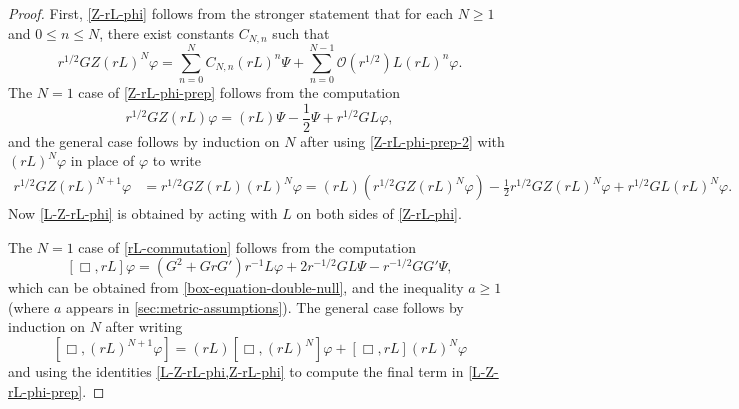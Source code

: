 \documentclass[10pt, reqno]{amsart}
\begin{document}
\begin{proof}
First, \cref{Z-rL-phi} follows from the stronger statement that for each \(N\ge 1\)
and \(0\le n\le N\), there exist constants \(C_{N,n}\) such that
\begin{equation}\label{Z-rL-phi-prep}
r^{1/2}GZ(rL)^N\varphi{} = \sum_{n=0}^NC_{N,n}(rL)^n\Psi{} + \sum_{n=0}^{N-1}\mathcal{O}(r^{1/2})L(rL)^n\varphi{}.
\end{equation}
The \(N = 1\) case of \cref{Z-rL-phi-prep} follows from the computation
\begin{equation}\label{Z-rL-phi-prep-2}
r^{1/2}GZ(rL)\varphi{} = (rL)\Psi{} - \frac{1}{2}\Psi{}  + r^{1/2}GL\varphi{},
\end{equation}
and the general case follows by induction on \(N\) after using
\cref{Z-rL-phi-prep-2} with \((rL)^N\varphi{}\) in place of \(\varphi{}\) to write
\begin{equation}
\begin{split}
r^{1/2}GZ(rL)^{N+1}\varphi{} &= r^{1/2}GZ(rL)(rL)^N\varphi{} = (rL)(r^{1/2}GZ(rL)^N\varphi{}) - \frac{1}{2}r^{1/2}GZ(rL)^N\varphi{} + r^{1/2}GL(rL)^N\varphi{}.
\end{split}
\end{equation}
Now \cref{L-Z-rL-phi} is obtained by acting with \(L\) on both sides of \cref{Z-rL-phi}.

The \(N = 1\) case of \cref{rL-commutation} follows from the computation
\begin{equation}\label{box-rL-phi-N1}
[\Box{},rL]\varphi{} = (G^2 + GrG')r^{-1}L\varphi{} + 2r^{-1/2}GL\Psi{} - r^{-1/2}GG'\Psi{},
\end{equation}
which can be obtained from \cref{box-equation-double-null}, and the inequality
\(a\ge 1\) (where \(a\) appears in \cref{sec:metric-assumptions}). The general case
follows by induction on \(N\) after writing
\begin{equation}\label{L-Z-rL-phi-prep}
[\Box{},(rL)^{N+1}\varphi{}] = (rL)[\Box{},(rL)^{N}]\varphi{} + [\Box{},rL](rL)^{N}\varphi{}
\end{equation}
and using the identities \cref{L-Z-rL-phi,Z-rL-phi} to compute the final term in
\cref{L-Z-rL-phi-prep}.
\end{proof}
\end{document}
